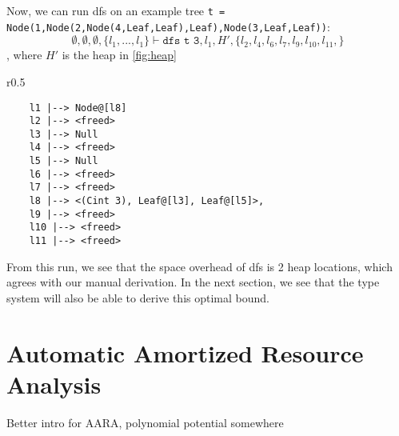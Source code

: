 \documentclass{easychair}
\newcommand{\jan}[1]{{\color{red} #1}}
\theoremstyle{definition}
\begin{document}
Now, we can run dfs on an example tree 
\texttt{t = Node(1,Node(2,Node(4,Leaf,Leaf),Leaf),Node(3,Leaf,Leaf))}:
\[
\emptyset,\emptyset,\emptyset,\{l_1,...,l_1\} 
	\vdash \texttt{dfs t 3}, l_1, H', 
	\{l_2, l_4, l_6, l_7, l_9, l_10, l_11,\}
\], where $H'$ is the heap in \ref{fig:heap}

\begin{wrapfigure}{r}{0.5\textwidth}
	\vspace{-20pt}
		\begin{center}
\begin{verbatim}
	l1 |--> Node@[l8] 
	l2 |--> <freed>
	l3 |--> Null 
	l4 |--> <freed>
	l5 |--> Null
	l6 |--> <freed>
	l7 |--> <freed>
	l8 |--> <(Cint 3), Leaf@[l3], Leaf@[l5]>, 
	l9 |--> <freed>
	l10 |--> <freed>
	l11 |--> <freed>
\end{verbatim}
		\end{center}
				\vspace{-20pt}
			\caption{$H'$}
		\vspace{-10pt}
\label{fig:heap}
\end{wrapfigure}

From this run, we see that the space overhead of dfs is 2 heap locations, which agrees with 
our manual derivation. In the next section, we see that the type system will also be 
able to derive this optimal bound. 

\section{Automatic Amortized Resource Analysis}
\label{sect:aara}

\jan{Better intro for AARA, polynomial potential somewhere}
\end{document}
